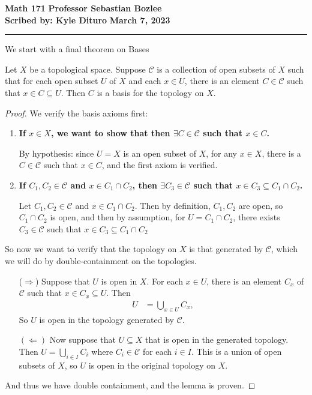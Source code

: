 \documentclass[12pt, twosided]{article}
\begin{document}
\noindent \textbf{Math 171} \hfill \textbf{Professor Sebastian Bozlee} \\
\textbf{Scribed by: Kyle Dituro} \hfill \textbf{March 7, 2023}\hrule
\vspace{.2in}

We start with a final theorem on Bases

\begin{lm}
  Let \(X\) be a topological space. Suppose \(\mathcal{C}\) is a collection of open subsets of \(X\) such that for each open subset \(U\) of \(X\) and each \(x \in U\), there is an element \(C \in \mathcal{C}\) such that \(x \in C \subseteq U\). Then \(C\) is a basis for the topology on \(X\).
\end{lm}
\begin{proof}
  We verify the basis axioms first:
  \begin{enumerate}
  \item \textbf{If \(x \in X\), we want to show that then \(\exists C \in \mathcal{C}\) such that \(x \in C\).}
    
    By hypothesis: since \(U = X\) is an open subset of \(X\), for any \(x \in X\), there is a \(C \in \mathcal{C}\) such that \(x \in C\), and the first axiom is verified.
    
  \item \textbf{If \(C_1, C_2 \in \mathcal{C}\) and \(x \in C_1 \cap C_2\), then \(\exists C_3 \in \mathcal{C}\) such that \(x \in C_3 \subseteq C_1 \cap C_2\).}

    Let \(C_1, C_2 \in \mathcal{C}\) and \(x \in C_1 \cap C_2\). Then by definition, \(C_1, C_2\) are open, so \(C_1 \cap C_2\) is open, and then by assumption, for \(U = C_1 \cap C_2\), there exists \(C_3 \in \mathcal{C}\) such that \(x \in C_3 \subseteq C_1 \cap C_2\)
  \end{enumerate} \partdone

  So now we want to verify that the topology on \(X\) is that generated by \(\mathcal{C}\), which we will do by double-containment on the topologies.

  \begin{enumerate}
  \item [(\(\Rightarrow\))] Suppose that \(U\) is open in \(X\). For each \(x \in U\), there is an element \(C_x\) of \(\mathcal{C}\) such that \(x \in C_x \subseteq U\). Then
    \begin{align*}
      U &= \bigcup_{x \in U} C_x,
    \end{align*}
    So \(U\) is open in the topology generated by \(\mathcal{C}\).
  \item [\((\Leftarrow)\)] Now suppose that \(U \subseteq X\) that is open in the generated topology. Then \(U = \bigcup_{i \in I} C_i\) where \(C_i \in \mathcal{C}\) for each \(i \in I\). This is a union of open subsets of \(X\), so \(U\) is open in the original topology on \(X\).
  \end{enumerate}
  And thus we have double containment, and the lemma is proven.
\end{proof}
\end{document}
